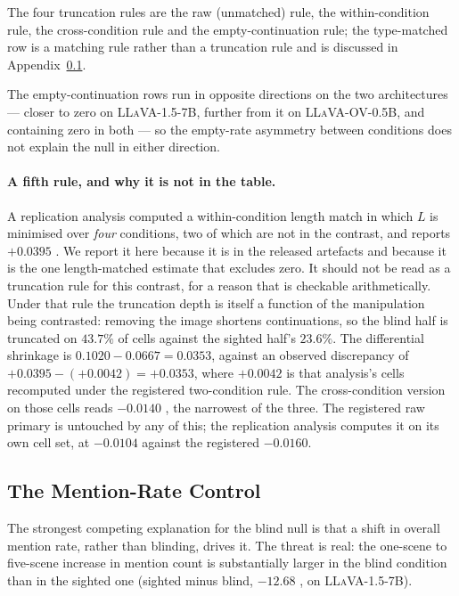 The four truncation rules are the raw (unmatched) rule, the
within-condition rule, the cross-condition rule and the empty-continuation rule; the type-matched row
is a matching rule rather than a truncation rule and is discussed in Appendix~\ref{app:mrate}.

The empty-continuation rows run in opposite directions on the two architectures --- closer to zero on
\textsc{LLaVA-1.5-7B}, further from it on \textsc{LLaVA-OV-0.5B}, and containing zero in both --- so the empty-rate asymmetry
between conditions does not explain the null in either direction.

\paragraph{A fifth rule, and why it is not in the table.} A replication analysis computed a
within-condition length match in which $L$ is minimised over \emph{four} conditions, two of which are
not in the contrast, and reports $+0.0395$ . We report it here because it is in
the released artefacts and because it is the one length-matched estimate that excludes zero. It
should not be read as a truncation rule for this contrast, for a reason that is checkable
arithmetically. Under that rule the truncation depth is itself a function of the manipulation being
contrasted: removing the image shortens continuations, so the blind half is truncated on $43.7\%$ of
cells against the sighted half's $23.6\%$. The differential shrinkage is $0.1020 - 0.0667 = 0.0353$,
against an observed discrepancy of $+0.0395 - (+0.0042) = +0.0353$, where $+0.0042$
 is that analysis's cells recomputed under the registered two-condition rule.
The cross-condition version on those cells reads $-0.0140$ , the
narrowest of the three. The registered raw primary is untouched by any of this; the replication
analysis computes it on its own cell set, at $-0.0104$ against the registered $-0.0160$.

\subsection{The Mention-Rate Control}
\label{app:mrate}

The strongest competing explanation for the blind null is that a shift in overall mention rate,
rather than blinding, drives it. The threat is real: the one-scene to five-scene increase in mention
count is substantially larger in the blind condition than in the sighted one (sighted minus blind,
$-12.68$ , on \textsc{LLaVA-1.5-7B}).

